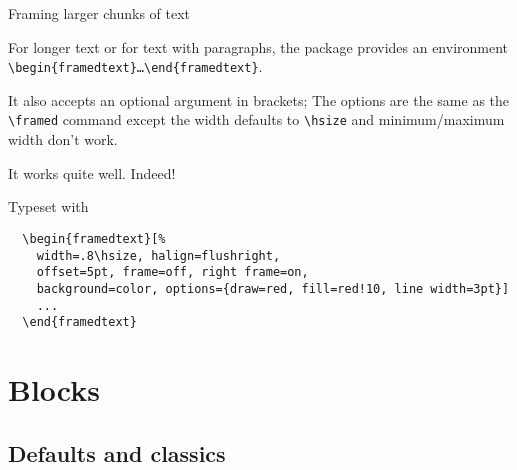 \documentclass[9pt]{beamer}
\def\com#1{\texttt{\textbackslash #1}}
\def\env#1{%
  \texttt{\textbackslash begin\{#1\}\dots\textbackslash end\{#1\}}}
\let\command\com
\let\environment\env
\begin{document}
\begin{frame}[fragile]
  {Framing larger chunks of text}

  \hfill
  \begin{framedtext}
    [width=.8\hsize, halign=flushright,
     offset=5pt, frame=off, right frame=on,
     background=color, options={draw=red, fill=red!10, line width=3pt}]
    For longer text or for text with paragraphs, the package provides an
    environment \environment{framedtext}.

    It also accepts an optional argument in brackets; The options are
    the same as the \command{framed} command except the width defaults
    to \command{hsize} and minimum/maximum width don't work.

    It works quite well. Indeed!
  \end{framedtext}

  Typeset with
  \begin{framedtext}
    [framepath={\sine{0,0}{.1\framedboxht-.1\framedboxdp}{10}{1pt}},
     options={draw=red, line width=1pt, line cap=round}]
\begin{verbatim}
  \begin{framedtext}[%
    width=.8\hsize, halign=flushright,
    offset=5pt, frame=off, right frame=on,
    background=color, options={draw=red, fill=red!10, line width=3pt}]
    ...
  \end{framedtext}
\end{verbatim}
  \end{framedtext}

\end{frame}



\section{Blocks}
\subsection{Defaults and classics}
\end{document}
